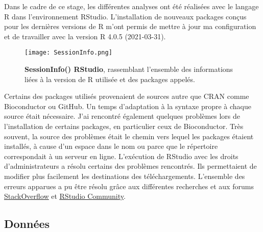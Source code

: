 \documentclass[twoside]{article}
\begin{document}
    \vspace{0.5cm}Dans le cadre de ce stage, les différentes analyses ont été réalisées avec le langage R dans l'environnement RStudio. L'installation de nouveaux packages conçus pour les dernières versions de R m'ont permis de mettre à jour ma configuration et de travailler avec la version R 4.0.5 (2021-03-31). 
    
    \vspace{0.5cm}
    \begin{figure}[h]
        \texttt{[image: SessionInfo.png]}
        \caption[SessionInfo()]{\textbf{SessionInfo() RStudio}, rassemblant l'ensemble des informations liées à la version de R utilisée et des packages appelés.}
    \end{figure}
    
    \vspace{0.5cm}Certains des packages utilisés provenaient de sources autre que CRAN comme Bioconductor ou GitHub. Un temps d'adaptation à la syntaxe propre à chaque source était nécessaire. J'ai rencontré également quelques problèmes lors de l'installation de certains packages, en particulier ceux de Bioconductor. Très souvent, la source des problèmes était le chemin vers lequel les packages étaient installés, à cause d'un espace dans le nom ou parce que le répertoire correspondait à un serveur en ligne. L'exécution de RStudio avec les droits d'administrateurs a résolu certains des problèmes rencontrés. Ils permettaient de modifier plus facilement les destinations des téléchargements. L'ensemble des erreurs apparues a pu être résolu grâce aux différentes recherches et aux forums \href{https://stackoverflow.com/}{\underline{StackOverflow}} et \href{https://community.rstudio.com/}{\underline{RStudio Community}}.


    \newpage
    \subsection{Données}
    
\end{document}
